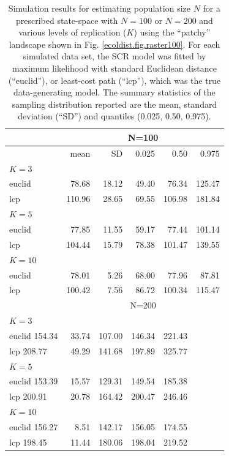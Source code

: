 \begin{table}[htp]
\label{tab.results1}
{\small
\caption{
Simulation results for estimating population size $N$ for a prescribed state-space with
$N=100$ or $N=200$ and various levels of replication ($K$)
using the ``patchy'' landscape shown in Fig.
 \ref{ecoldist.fig.raster100}.
For each simulated
data set, the SCR model was fitted by maximum likelihood with
standard Euclidean distance (``euclid''), or least-cost path
(``lcp''), which was the true data-generating model.
The summary statistics of the
sampling distribution reported are the mean, standard deviation
(``SD'') and quantiles (0.025, 0.50, 0.975).
}
\begin{tabular}{l|rrrrr}
  \hline
         & \multicolumn{5}{c}{N=100  }  \\ \hline
         &   mean &  SD  & 0.025 & 0.50  & 0.975   \\ \hline
$K=3$      &        &      &       &       &         \\
euclid   &  78.68 & 18.12& 49.40 & 76.34 & 125.47  \\
lcp      & 110.96 & 28.65& 69.55 &106.98 & 181.84  \\
$K=5$     &        &      &       &       &         \\
euclid   &  77.85 & 11.55& 59.17 & 77.44 & 101.14  \\
lcp      & 104.44 & 15.79& 78.38 &101.47 & 139.55  \\
$K=10$     &        &      &       &       &         \\
euclid   &  78.01 & 5.26 & 68.00 & 77.96 & 87.81   \\
lcp      & 100.42 & 7.56 & 86.72 &100.34 & 115.47  \\ \hline
        & \multicolumn{5}{c}{N=200   }  \\ \hline
$K=3$      &        &      &       &       &         \\
euclid  154.34& 33.74& 107.00& 146.34& 221.43\\
lcp     208.77& 49.29& 141.68& 197.89& 325.77\\
$K=5$           &      &       &       &        \\
euclid   153.39& 15.57& 129.31& 149.54& 185.38\\
lcp      200.91& 20.78& 164.42& 200.47& 246.46\\
$K=10$           &      &       &       &       \\
euclid   156.27&  8.51& 142.17& 156.05& 174.55\\
lcp      198.45& 11.44& 180.06& 198.04& 219.52\\ \hline
\end{tabular}
}
\label{ecoldist.tab.simresults}
\end{table}














